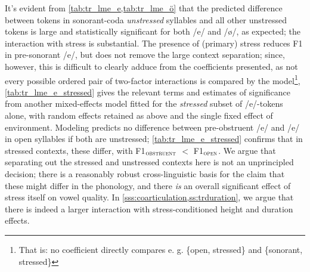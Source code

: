 It's evident from \cref{tab:tr_lme_e,tab:tr_lme_ö} that the predicted difference between tokens in sonorant-coda \emph{unstressed} syllables and all other unstressed tokens is large and statistically significant for both /e/ and /\o/, as expected; the interaction with stress is substantial. The presence of (primary) stress reduces F1 in pre-sonorant /e/, but does not remove the large context separation; since, however, this is difficult to clearly adduce from the coefficients presented, as not every possible ordered pair of two-factor interactions is compared by the model\footnote{That is: no coefficient directly compares e. g. \{open, stressed\} and \{sonorant, stressed\}}, \cref{tab:tr_lme_e_stressed} gives the relevant terms and estimates of significance from another mixed-effects model fitted for the \emph{stressed} subset of /e/-tokens alone, with random effects retained as above and the single fixed effect of environment. Modeling predicts no difference between pre-obstruent /e/ and /e/ in open syllables if both are unstressed; \cref{tab:tr_lme_e_stressed} confirms that in stressed contexts, these differ, with F1$_\textsc{obstruent}$ $<$ F1$_\textsc{open}$. We argue that separating out the stressed and unstressed contexts here is not an unprincipled decision; there is a reasonably robust cross-linguistic basis for the claim that these might differ in the phonology, and there \emph{is} an overall significant effect of stress itself on vowel quality. In \cref{sss:coarticulation,ss:trduration}, we argue that there is indeed a larger interaction with stress-conditioned height and duration effects.

